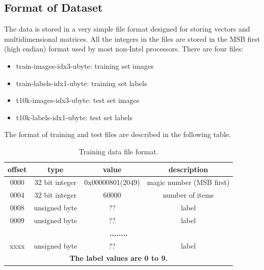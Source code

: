 \subsection{Format of Dataset}
The data is stored in a very simple file format designed for storing vectors and multidimensional matrices. All the integers in the files are stored in the MSB first (high endian) format used by most non-Intel processors. There are four files:
\begin{itemize}
  \item train-images-idx3-ubyte: training set images
  \item train-labels-idx1-ubyte: training set labels
  \item t10k-images-idx3-ubyte:  test set images
  \item t10k-labels-idx1-ubyte:  test set labels
\end{itemize}
The format of training and test files are described in the following table.
\begin{table}[ht]
\centering
\begin{tabular}{|c|c|c|c|}
\hline
\textbf{offset} & \textbf{type}    &      \textbf{value}    &      \textbf{description} \\
\hline
0000  &   32 bit integer & 0x00000801(2049) & magic number (MSB first) \\
\hline
0004  &   32 bit integer & 60000       &     number of items \\
\hline
0008  &   unsigned byte  & ??          &     label \\
\hline
0009  &   unsigned byte  & ??          &     label \\
\hline
\multicolumn{4}{|c|}{\textbf{........}} \\
\hline
xxxx  &   unsigned byte  & ??          &     label \\
\hline
\multicolumn{4}{|c|}{\textbf{The label values are 0 to 9.}} \\
\hline
\end{tabular}
\caption{Training data file format.}
\label{tbl:training-file-format}
\end{table}

